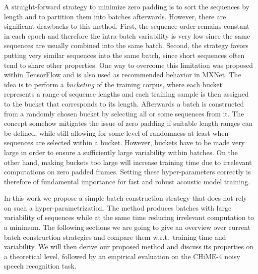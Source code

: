 \documentclass{article}
\begin{document}
    A straight-forward strategy to minimize zero padding is to sort the sequences by length and to partition them into
    batches afterwards. However, there are significant drawbacks to this method. First, the sequence order remains constant in each epoch 
    and therefore the intra-batch variability is very low since the same sequences are usually combined into the same batch. Second, the strategy favors putting very similar sequences into the same batch, since short sequences often tend to share other properties.
    One way to overcome this limitation was proposed within TensorFlow and is also used as recommended 
    behavior in MXNet. The idea is to perform a \textit{bucketing} of the training corpus, where each bucket represents
    a range of sequence lengths and each training sample is then assigned to the bucket that corresponds to its length.
    Afterwards a batch is constructed from a randomly chosen bucket by selecting all or some sequences from it.
    The concept somehow mitigates the issue of zero padding if suitable length ranges can be defined, while still allowing for 
    some level of randomness at least when sequences are selected within a bucket. However, buckets have to be made very large 
    in order to ensure a sufficiently large variability within batches. On the other hand, making buckets too large will 
    increase training time due to irrelevant computations on zero padded frames. Setting these hyper-parameters correctly is
    therefore of fundamental importance for fast and robust acoustic model training.
    
    In this work we propose a simple batch construction strategy that does not rely on such a hyper-parametrization. The method 
    produces batches with large variability of sequences while at the same time reducing irrelevant computation to a minimum.
    The following sections we are going to give an overview over current batch construction strategies and compare them 
    w.r.t.~training time and variability. We will then derive our proposed method and discuss its properties on a theoretical
    level, followed by an empirical evaluation on the CHiME-4 noisy speech recognition task. 
   
\end{document}
